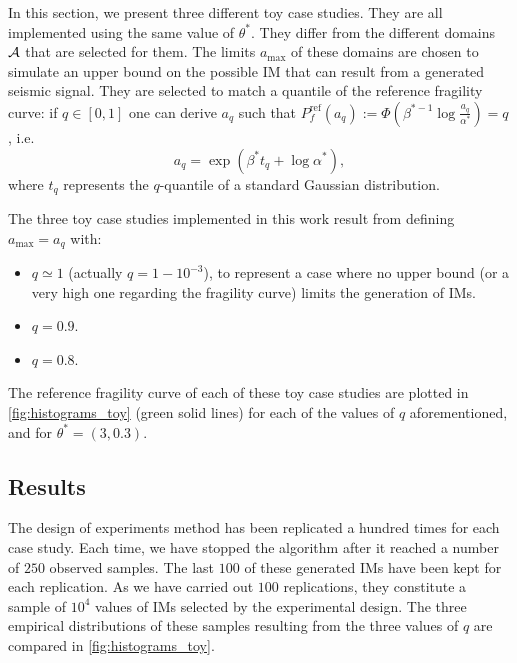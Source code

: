     In this section, we present three different toy case studies. They are all implemented using the same value of $\theta^\ast$. 
    They differ from the different domains $\mathcal{A}$ that are selected for them.
    The limits $a_{\text{max}}$ of these domains are chosen to simulate an upper bound 
    on the possible IM that can result from a generated seismic signal.
    They are selected to match a quantile of the reference fragility curve: if $q\in[0,1]$ one can derive $a_q$ such that $P^{\text{ref}}_f(a_q):=\Phi\left(\beta^{\ast -1}\log\frac{a_q}{\alpha^{\ast}}\right)=q$, i.e.
        \begin{equation}
            a_q = \exp\left( \beta^\ast t_q+\log\alpha^\ast \right),
        \end{equation}
    where $t_q$ represents the $q$-quantile of a standard Gaussian distribution.
    
    The three toy case studies implemented in this work result from defining $a_{\text{max}}=a_q$ with:
    \begin{itemize}
        \item $q\simeq1$ (actually $q=1-10^{-3}$), to represent a case where no upper bound (or a very high one regarding the fragility curve) limits the generation of IMs. %
        \item $q=0.9$.
        \item $q=0.8$.
    \end{itemize}
    The reference fragility curve of each of these toy case studies are plotted in  \cref{fig:histograms_toy} (green solid lines) for each of the values of $q$ aforementioned, and for $\theta^\ast=(3,0.3)$. 
    
    
    
    
    
    \subsection{Results}
    
    The design of experiments method has been replicated a hundred times for each case study. Each time, we have stopped the algorithm after it reached a number of $250$ observed samples.
    The last $100$ of these generated IMs have been kept for each replication. As we have carried out $100$ replications, they constitute a sample of $10^4$ values of IMs selected by the experimental design.
    The three empirical distributions of these samples resulting from the three values of $q$ are compared in  \cref{fig:histograms_toy}.
    
